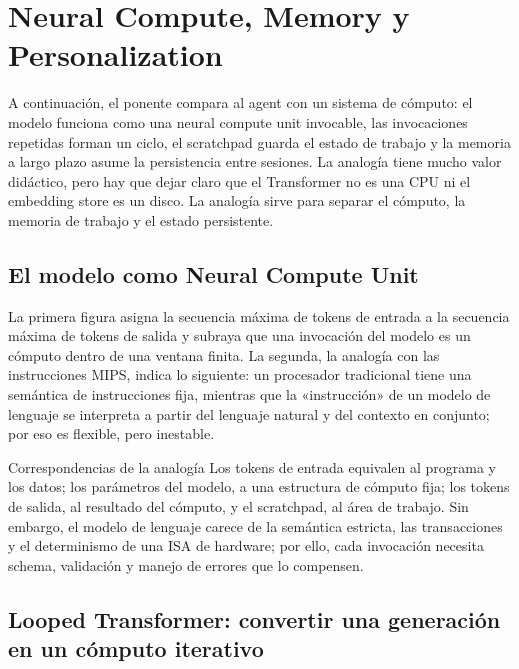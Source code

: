 \section{Neural Compute, Memory y Personalization}

A continuación, el ponente compara al agent con un sistema de cómputo: el modelo funciona como una neural compute unit invocable, las invocaciones repetidas forman un ciclo, el scratchpad guarda el estado de trabajo y la memoria a largo plazo asume la persistencia entre sesiones. La analogía tiene mucho valor didáctico, pero hay que dejar claro que el Transformer no es una CPU ni el embedding store es un disco. La analogía sirve para separar el cómputo, la memoria de trabajo y el estado persistente.

\subsection{El modelo como Neural Compute Unit}

La primera figura asigna la secuencia máxima de tokens de entrada a la secuencia máxima de tokens de salida y subraya que una invocación del modelo es un cómputo dentro de una ventana finita. La segunda, la analogía con las instrucciones MIPS, indica lo siguiente: un procesador tradicional tiene una semántica de instrucciones fija, mientras que la «instrucción» de un modelo de lenguaje se interpreta a partir del lenguaje natural y del contexto en conjunto; por eso es flexible, pero inestable.



\begin{knowledgebox}{Correspondencias de la analogía}
Los tokens de entrada equivalen al programa y los datos; los parámetros del modelo, a una estructura de cómputo fija; los tokens de salida, al resultado del cómputo, y el scratchpad, al área de trabajo. Sin embargo, el modelo de lenguaje carece de la semántica estricta, las transacciones y el determinismo de una ISA de hardware; por ello, cada invocación necesita schema, validación y manejo de errores que lo compensen.
\end{knowledgebox}

\subsection{Looped Transformer: convertir una generación en un cómputo iterativo}

